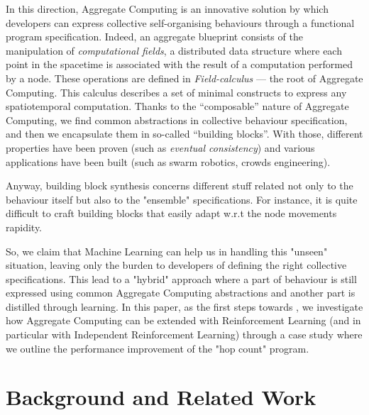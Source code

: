 \documentclass[
  twocolumn,
]{ceurart}
\begin{document}
In this direction, Aggregate Computing is an innovative solution by which 
 developers can express collective self-organising behaviours through a functional program specification.
%
Indeed, an aggregate blueprint consists of the manipulation of \textit{computational fields}, a distributed
 data structure where each point in the spacetime is associated with the result of a computation
 performed by a node.
%
These operations are defined in \textit{Field-calculus} --- the root of Aggregate Computing. 
 This calculus describes a set of minimal constructs to express any spatiotemporal computation.
%
Thanks to the ``composable'' nature of Aggregate Computing, we find common abstractions 
 in collective behaviour specification, and then we encapsulate them in so-called ``building blocks''.
%
With those, different properties have been proven (such as \textit{eventual consistency}) and various
 applications have been built (such as swarm robotics, crowds engineering).

Anyway, building block synthesis concerns different stuff related not only to the behaviour itself
 but also to the "ensemble" specifications. 
 For instance, it is quite difficult to craft building blocks
 that easily adapt w.r.t the node movements rapidity.

So, we claim that Machine Learning can help us in handling this "unseen" situation, leaving only the burden
 to developers of defining the right collective specifications.
%
This lead to a "hybrid" approach where a part of behaviour is still expressed using common 
 Aggregate Computing abstractions and another part is distilled through learning.
%
In this paper, as the first steps towards \hybridaggregate{}, we investigate how Aggregate Computing can be
 extended with Reinforcement Learning (and in particular with Independent Reinforcement Learning) through a case
 study where we outline the performance improvement of the "hop count" program.

\section{Background and Related Work}
\end{document}
